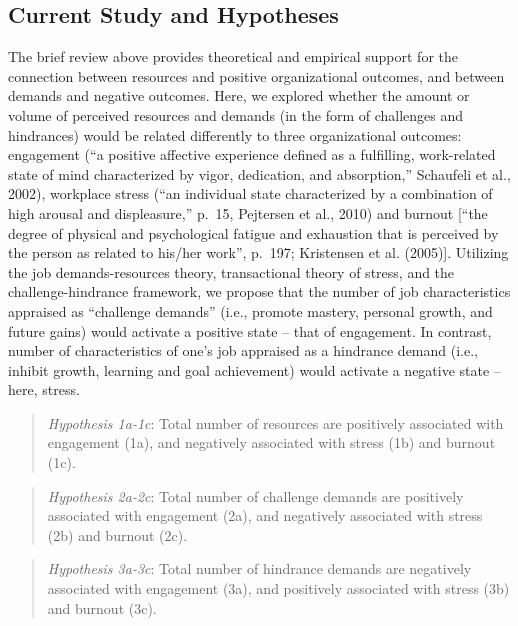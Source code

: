 \documentclass[
  man]{apa6}
\begin{document}
\hypertarget{current-study-and-hypotheses}{%
\subsection{Current Study and Hypotheses}\label{current-study-and-hypotheses}}

The brief review above provides theoretical and empirical support for the connection between resources and positive organizational outcomes, and between demands and negative outcomes. Here, we explored whether the amount or volume of perceived resources and demands (in the form of challenges and hindrances) would be related differently to three organizational outcomes: engagement (``a positive affective experience defined as a fulfilling, work-related state of mind characterized by vigor, dedication, and absorption,'' Schaufeli et al., 2002), workplace stress (``an individual state characterized by a combination of high arousal and displeasure,'' p.~15, Pejtersen et al., 2010) and burnout {[}``the degree of physical and psychological fatigue and exhaustion that is perceived by the person as related to his/her work'', p.~197; Kristensen et al. (2005){]}. Utilizing the job demands-resources theory, transactional theory of stress, and the challenge-hindrance framework, we propose that the number of job characteristics appraised as ``challenge demands'' (i.e., promote mastery, personal growth, and future gains) would activate a positive state -- that of engagement. In contrast, number of characteristics of one's job appraised as a hindrance demand (i.e., inhibit growth, learning and goal achievement) would activate a negative state -- here, stress.

\begin{quote}
\emph{Hypothesis 1a-1c}: Total number of resources are positively associated with engagement (1a), and negatively associated with stress (1b) and burnout (1c).
\end{quote}

\begin{quote}
\emph{Hypothesis 2a-2c}: Total number of challenge demands are positively associated with engagement (2a), and negatively associated with stress (2b) and burnout (2c).
\end{quote}

\begin{quote}
\emph{Hypothesis 3a-3c}: Total number of hindrance demands are negatively associated with engagement (3a), and positively associated with stress (3b) and burnout (3c).
\end{quote}
\end{document}
